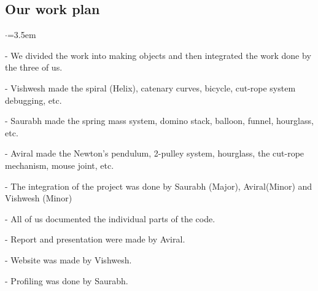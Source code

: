 \documentclass[12pt, a4paper]{article}
\begin{document}
\subsection{Our work plan}
\begin{list}{$\cdot$}{\leftmargin=3.5em}
\item[-] {We divided the work into making objects and then integrated the work done by the three of us.}

\item[-] {Vishwesh made the spiral (Helix), catenary curves, bicycle, cut-rope system debugging, etc.}
\item[-] {Saurabh made the spring mass system, domino stack, balloon, funnel, hourglass, etc.}
\item[-] {Aviral made the Newton's pendulum, 2-pulley system, hourglass, the cut-rope mechanism, mouse joint, etc.}
\item[-] {The integration of the project was done by Saurabh (Major), Aviral(Minor) and Vishwesh (Minor)}
\item[-] {All of us documented the individual parts of the code.}
\item[-] {Report and presentation were made by Aviral.}
\item[-] {Website was made by Vishwesh.}
\item[-] {Profiling was done by Saurabh.}
\end{list}
\end{document}
